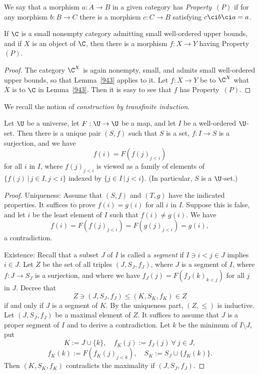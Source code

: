 \documentclass[12pt]{article}
\theoremstyle{remark}
\theoremstyle{definition}
\begin{document}
\begin{df}[Property~$(P)$] 
We say that a morphism $a:A\to B$ in a given category has \emph{Property}~$(P)$ if for any morphism $b:B\to C$ there is a morphism $c:C\to B$ satisfying $c\ci b\ci a=a$.  
\end{df}  

\begin{lem}[Sublemma 9.4.4 p. 229] 
If $\C$ is a small nonempty category admitting small well-ordered upper bounds, and if $X$ is an object of $\C$, then there is a morphism $f:X\to Y$ having Property~$(P)$.
\end{lem}

\begin{proof}
The category $\C^X$ is again nonempty, small, and admits small well-ordered upper bounds, so that Lemma~\ref{943} applies to it. Let $f:X\to Y$ be to $\C^X$ what $X$ is to $\C$ in Lemma~\ref{943}. Then it is easy to see that $f$ has Property~$(P)$. 
\end{proof}

We recall the notion of {\em construction by transfinite induction}. 

\begin{thm} 
Let $\U$ be a universe, let $F:\U\to\U$ be a map, and let $I$ be a well-ordered $\U$-set. Then there is a unique pair $(S,f)$ such that $S$ is a set, $f:I\to S$ is a surjection, and we have 
$$
f(i)=F(f(j)_{j<i})
$$ 
for all $i$ in $I$, where $f(j)_{j<i}$ is viewed as a family of elements of $\{f(j)\,|\,j\in I,j<i\}$ indexed by $\{j\in I\,|\,j<i\}$. (In particular, $S$ is a $\U$-set.)
\end{thm}

\begin{proof}
Uniqueness: Assume that $(S,f)$ and $(T,g)$ have the indicated properties. It suffices to prove $f(i)=g(i)$ for all $i$ in $I$. Suppose this is false, and let $i$ be the least element of $I$ such that $f(i)\neq g(i)$. We have 
$$
f(i)=F(f(j)_{j<i})=F(g(j)_{j<i})=g(i),
$$ 
a contradiction. 

Existence: Recall that a subset $J$ of $I$ is called a {\em segment} if $I\ni i<j\in J$ implies $i\in J$. Let $Z$ be the set of all triples $(J,S_J,f_J)$, where $J$ is a segment of $I$, where $f:J\to S_J$ is a surjection, and where we have $f_J(j)=F(f_J(k)_{k<j})$ for all $j$ in $J$. Decree that 
$$
Z\ni(J,S_J,f_J)\le(K,S_K,f_K)\in Z
$$ 
if and only if $J$ is a segment of $K$. By the uniqueness part, $(Z,\le)$ is inductive. Let $(J,S_J,f_J)$ be a maximal element of $Z$. It suffices to assume that $J$ is a proper segment of $I$ and to derive a contradiction. Let $k$ be the minimum of $I\setminus J$, put 
$$
K:=J\cup\{k\},\quad f_K(j):=f_J(j)\ \forall\ j\in J,
$$
$$
f_K(k):=F(f_K(j)_{j<k}),\quad S_K:=S_J\cup\{f_K(k)\}.
$$ 
Then $(K,S_K,f_K)$ contradicts the maximality if $(J,S_J,f_J)$. 
\end{proof}
\end{document}
